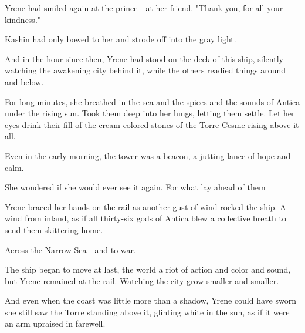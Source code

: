 Yrene had smiled again at the prince---at her friend. "Thank you, for all your kindness."

Kashin had only bowed to her and strode off into the gray light.

And in the hour since then, Yrene had stood on the deck of this ship, silently watching the awakening city behind it, while the others readied things around and below.

For long minutes, she breathed in the sea and the spices and the sounds of Antica under the rising sun. Took them deep into her lungs, letting them settle. Let her eyes drink their fill of the cream-colored stones of the Torre Cesme rising above it all.

Even in the early morning, the tower was a beacon, a jutting lance of hope and calm.

She wondered if she would ever see it again. For what lay ahead of them


Yrene braced her hands on the rail as another gust of wind rocked the ship. A wind from inland, as if all thirty-six gods of Antica blew a collective breath to send them skittering home.

Across the Narrow Sea---and to war.

The ship began to move at last, the world a riot of action and color and sound, but Yrene remained at the rail. Watching the city grow smaller and smaller.

And even when the coast was little more than a shadow, Yrene could have sworn she still saw the Torre standing above it, glinting white in the sun, as if it were an arm upraised in farewell.

